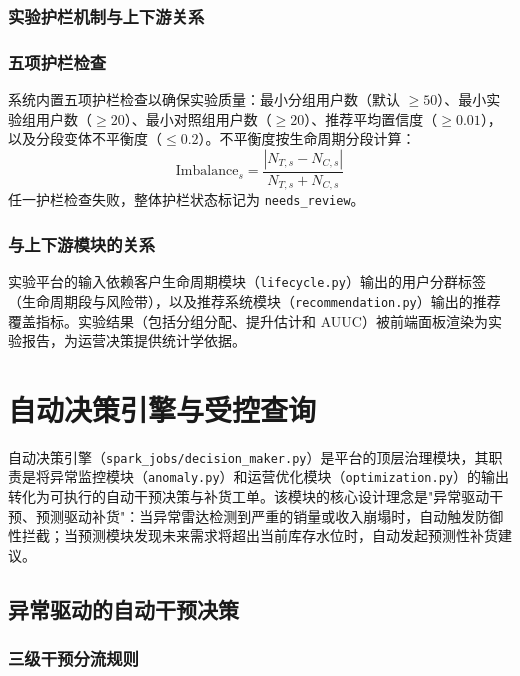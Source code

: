 \subsubsection{实验护栏机制与上下游关系}

\subsubsection{五项护栏检查}

系统内置五项护栏检查以确保实验质量：最小分组用户数（默认 $\geq 50$）、最小实验组用户数（$\geq 20$）、最小对照组用户数（$\geq 20$）、推荐平均置信度（$\geq 0.01$），以及分段变体不平衡度（$\leq 0.2$）。不平衡度按生命周期分段计算：
\begin{equation}
    \text{Imbalance}_s = \frac{|N_{T,s} - N_{C,s}|}{N_{T,s} + N_{C,s}}
    \label{eq:segment-imbalance}
\end{equation}
任一护栏检查失败，整体护栏状态标记为 \texttt{needs\_review}。

\subsubsection{与上下游模块的关系}

实验平台的输入依赖客户生命周期模块（\texttt{lifecycle.py}）输出的用户分群标签（生命周期段与风险带），以及推荐系统模块（\texttt{recommendation.py}）输出的推荐覆盖指标。实验结果（包括分组分配、提升估计和 AUUC）被前端面板渲染为实验报告，为运营决策提供统计学依据。

\section{自动决策引擎与受控查询}

自动决策引擎（\texttt{spark\_jobs/decision\_maker.py}）是平台的顶层治理模块，其职责是将异常监控模块（\texttt{anomaly.py}）和运营优化模块（\texttt{optimization.py}）的输出转化为可执行的自动干预决策与补货工单。该模块的核心设计理念是"异常驱动干预、预测驱动补货"：当异常雷达检测到严重的销量或收入崩塌时，自动触发防御性拦截；当预测模块发现未来需求将超出当前库存水位时，自动发起预测性补货建议。

\subsection{异常驱动的自动干预决策}

\subsubsection{三级干预分流规则}

